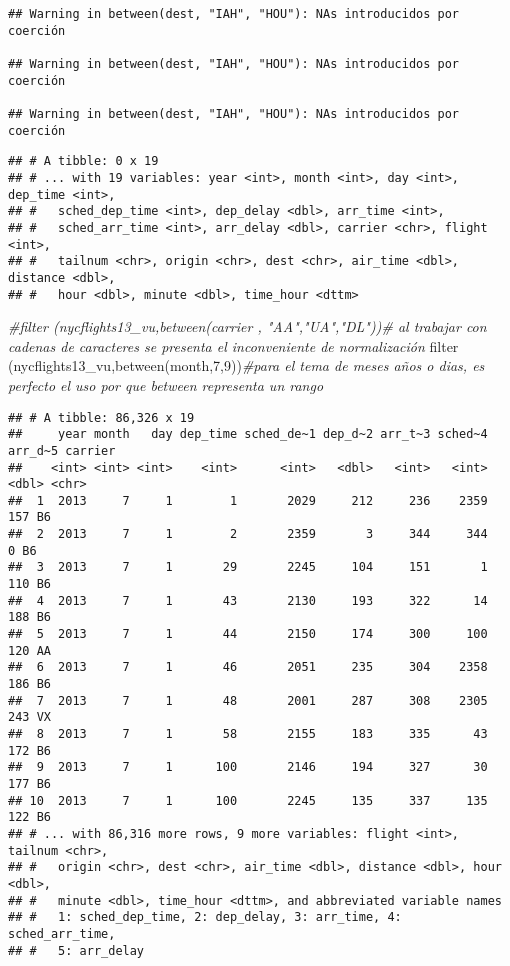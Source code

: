 \documentclass[
]{article}
\newenvironment{Shaded}{\begin{snugshade}}{\end{snugshade}}
\newcommand{\CommentTok}[1]{\textcolor[rgb]{0.56,0.35,0.01}{\textit{#1}}}
\newcommand{\DecValTok}[1]{\textcolor[rgb]{0.00,0.00,0.81}{#1}}
\newcommand{\FunctionTok}[1]{\textcolor[rgb]{0.00,0.00,0.00}{#1}}
\newcommand{\NormalTok}[1]{#1}
\begin{document}
\begin{verbatim}
## Warning in between(dest, "IAH", "HOU"): NAs introducidos por coerción

## Warning in between(dest, "IAH", "HOU"): NAs introducidos por coerción

## Warning in between(dest, "IAH", "HOU"): NAs introducidos por coerción
\end{verbatim}

\begin{verbatim}
## # A tibble: 0 x 19
## # ... with 19 variables: year <int>, month <int>, day <int>, dep_time <int>,
## #   sched_dep_time <int>, dep_delay <dbl>, arr_time <int>,
## #   sched_arr_time <int>, arr_delay <dbl>, carrier <chr>, flight <int>,
## #   tailnum <chr>, origin <chr>, dest <chr>, air_time <dbl>, distance <dbl>,
## #   hour <dbl>, minute <dbl>, time_hour <dttm>
\end{verbatim}

\begin{Shaded}
\begin{Highlighting}[]
\CommentTok{\#filter (nycflights13\_vu,between(carrier , "AA","UA","DL"))\# al trabajar con cadenas de caracteres se presenta el inconveniente de normalización}
\FunctionTok{filter}\NormalTok{ (nycflights13\_vu,}\FunctionTok{between}\NormalTok{(month,}\DecValTok{7}\NormalTok{,}\DecValTok{9}\NormalTok{))}\CommentTok{\#para el tema de meses años o dias, es perfecto el uso por que between representa un rango}
\end{Highlighting}
\end{Shaded}

\begin{verbatim}
## # A tibble: 86,326 x 19
##     year month   day dep_time sched_de~1 dep_d~2 arr_t~3 sched~4 arr_d~5 carrier
##    <int> <int> <int>    <int>      <int>   <dbl>   <int>   <int>   <dbl> <chr>  
##  1  2013     7     1        1       2029     212     236    2359     157 B6     
##  2  2013     7     1        2       2359       3     344     344       0 B6     
##  3  2013     7     1       29       2245     104     151       1     110 B6     
##  4  2013     7     1       43       2130     193     322      14     188 B6     
##  5  2013     7     1       44       2150     174     300     100     120 AA     
##  6  2013     7     1       46       2051     235     304    2358     186 B6     
##  7  2013     7     1       48       2001     287     308    2305     243 VX     
##  8  2013     7     1       58       2155     183     335      43     172 B6     
##  9  2013     7     1      100       2146     194     327      30     177 B6     
## 10  2013     7     1      100       2245     135     337     135     122 B6     
## # ... with 86,316 more rows, 9 more variables: flight <int>, tailnum <chr>,
## #   origin <chr>, dest <chr>, air_time <dbl>, distance <dbl>, hour <dbl>,
## #   minute <dbl>, time_hour <dttm>, and abbreviated variable names
## #   1: sched_dep_time, 2: dep_delay, 3: arr_time, 4: sched_arr_time,
## #   5: arr_delay
\end{verbatim}
\end{document}
